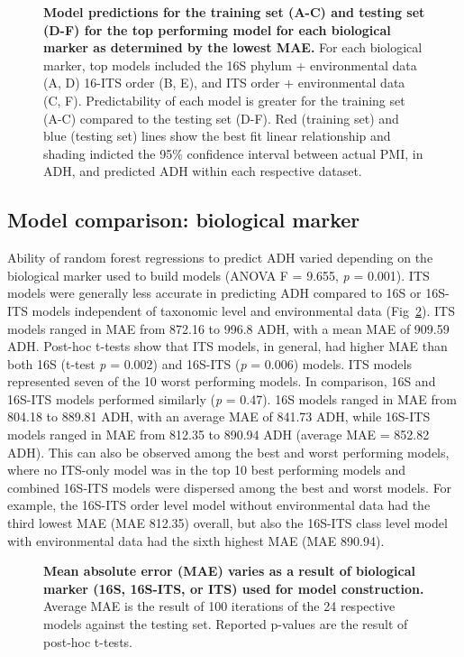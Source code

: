\documentclass[
  10pt,
  letterpaper,
]{article}
\begin{document}
\begin{figure}[!h]
\caption{{\bf Model predictions for the training set (A-C) and testing set (D-F) for the top performing model for each biological marker as determined by the lowest MAE.}
For each biological marker, top models included the 16S phylum + environmental data (A, D) 16-ITS order (B, E), and ITS order + environmental data (C, F). Predictability of each model is greater for the training set (A-C) compared to the testing set (D-F). Red (training set) and blue (testing set) lines show the best fit linear relationship and shading indicted the 95\% confidence interval between actual PMI, in ADH, and predicted ADH within each respective dataset.}
\label{fig2}
\end{figure}

\hypertarget{model-comparison-biological-marker}{%
\subsection{Model comparison: biological
marker}\label{model-comparison-biological-marker}}

Ability of random forest regressions to predict ADH varied depending on
the biological marker used to build models (ANOVA F = 9.655, \emph{p} =
0.001). ITS models were generally less accurate in predicting ADH
compared to 16S or 16S-ITS models independent of taxonomic level and
environmental data (Fig~\ref{fig3}). ITS models ranged in MAE from
872.16 to 996.8 ADH, with a mean MAE of 909.59 ADH. Post-hoc t-tests
show that ITS models, in general, had higher MAE than both 16S (t-test
\emph{p} = 0.002) and 16S-ITS (\emph{p} = 0.006) models. ITS models
represented seven of the 10 worst performing models. In comparison, 16S
and 16S-ITS models performed similarly (\emph{p} = 0.47). 16S models
ranged in MAE from 804.18 to 889.81 ADH, with an average MAE of 841.73
ADH, while 16S-ITS models ranged in MAE from 812.35 to 890.94 ADH
(average MAE = 852.82 ADH). This can also be observed among the best and
worst performing models, where no ITS-only model was in the top 10 best
performing models and combined 16S-ITS models were dispersed among the
best and worst models. For example, the 16S-ITS order level model
without environmental data had the third lowest MAE (MAE 812.35)
overall, but also the 16S-ITS class level model with environmental data
had the sixth highest MAE (MAE 890.94).

\begin{figure}[!h]
\caption{{\bf Mean absolute error (MAE) varies as a result of biological marker (16S, 16S-ITS, or ITS) used for model construction.}
Average MAE is the result of 100 iterations of the 24 respective models against the testing set. Reported p-values are the result of post-hoc t-tests.}
\label{fig3}
\end{figure}
\end{document}
